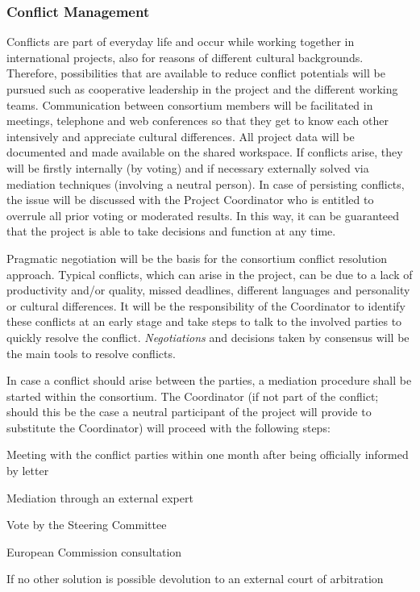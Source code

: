 \subsubsection{Conflict Management}
\label{sec:confl_mng}

Conflicts are part of everyday life and occur while working together
in international projects, also for reasons of different cultural
backgrounds. Therefore, possibilities that are available to reduce
conflict potentials will be pursued such as cooperative leadership in
the project and the different working teams. Communication between
consortium members will be facilitated in meetings, telephone and web
conferences so that they get to know each other intensively and
appreciate cultural differences. All project data will be documented
and made available on the shared workspace. If conflicts arise, they
will be firstly internally (by voting) and if necessary externally
solved via mediation techniques (involving a neutral person). In case
of persisting conflicts, the issue will be discussed with the Project
Coordinator who is entitled to overrule all prior voting or moderated
results. In this way, it can be guaranteed that the project is able to
take decisions and function at any time.

Pragmatic negotiation will be the basis for the consortium conflict
resolution approach. Typical conflicts, which can arise in the
project, can be due to a lack of productivity and/or quality, missed
deadlines, different languages and personality or cultural
differences. It will be the responsibility of the Coordinator to identify these
conflicts at an early stage and take steps to talk to the involved
parties to quickly resolve the conflict.  {\em Negotiations} and
decisions taken by consensus will be the main tools to resolve
conflicts.

In case a conflict should arise between the parties, a mediation
procedure shall be started within the consortium. The Coordinator (if
not part of the conflict; should this be the case a neutral
participant of the project will provide to substitute the Coordinator)
will proceed with the following steps:
\begin{denseItemize}
\item Meeting with the conflict parties within one month after being
  officially informed by letter
\item Mediation through an external expert
\item Vote by the Steering Committee
\item European Commission consultation
\item If no other solution is possible devolution to an external court
  of arbitration
\end{denseItemize}

